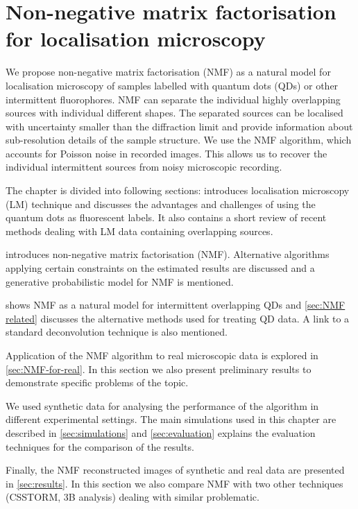 \chapter{Non-negative matrix factorisation for localisation microscopy\label{ch:NMF}}
We propose non-negative matrix factorisation (NMF) as a natural model for localisation microscopy of samples labelled with quantum dots (QDs) or other intermittent fluorophores. NMF can separate the individual highly overlapping sources with individual different shapes. The separated sources can be localised with uncertainty smaller than the diffraction limit and provide information about sub-resolution details of the sample structure. We use the NMF algorithm, which accounts for Poisson noise in recorded images. This allows us to recover the individual intermittent sources from noisy microscopic recording.

The chapter is divided into following sections:  introduces localisation microscopy (LM) technique and discusses the advantages and challenges of using the quantum dots as fluorescent labels. It also contains a short review of recent methods dealing with LM data containing overlapping sources. 

 introduces non-negative matrix factorisation (NMF). Alternative algorithms applying certain constraints on the estimated results are discussed and a generative probabilistic model for NMF is mentioned.

 shows NMF as a natural model for intermittent overlapping QDs and \autoref{sec:NMF related} discusses the alternative methods used for treating QD data. A link to a standard deconvolution technique is also mentioned. 

Application of the NMF algorithm to real microscopic data is explored in \autoref{sec:NMF-for-real}. In this section we also present preliminary results to demonstrate specific problems of the topic.

We used synthetic data for analysing the performance of the algorithm in different experimental settings. The main simulations used in this chapter are described in \autoref{sec:simulations} and \autoref{sec:evaluation} explains the evaluation techniques for the comparison of the results.

Finally, the NMF reconstructed images of synthetic and real data are presented in \autoref{sec:results}. In this section we also compare NMF with two other techniques (CSSTORM, 3B analysis) dealing with similar problematic. 

